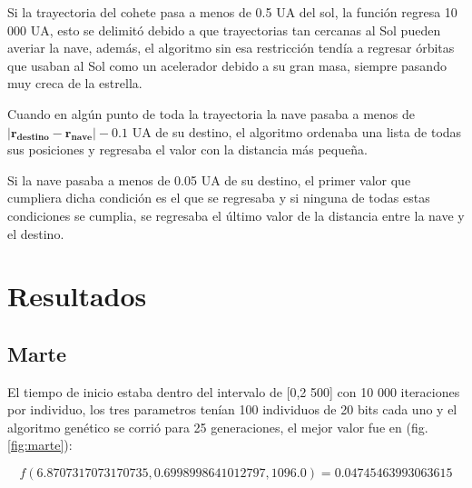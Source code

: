 \documentclass[12pt,letterpaper]{article}
\begin{document}
Si la trayectoria del cohete pasa a menos de 0.5 UA del sol, la función regresa 10 000 UA, esto se delimitó debido a que trayectorias tan cercanas al Sol pueden averiar la nave, además, el algoritmo sin esa restricción tendía a regresar órbitas que usaban al Sol como un acelerador debido a su gran masa, siempre pasando muy creca de la estrella.

Cuando en algún punto de toda la trayectoria la nave pasaba a menos de $|\mathbf{r_{destino}}-\mathbf{r_{nave}}|-0.1$ UA de su destino, el algoritmo ordenaba una lista de todas sus posiciones y regresaba el valor con la distancia más pequeña.

Si la nave pasaba a menos de 0.05 UA de su destino, el primer valor que cumpliera dicha condición es el que se regresaba y si ninguna de todas estas condiciones se cumplia, se regresaba el último valor de la distancia entre la nave y el destino.

\section*{Resultados}

\subsection*{Marte}

El tiempo de inicio estaba dentro del intervalo de [0,2 500] con 10 000 iteraciones por individuo, los tres parametros tenían 100 individuos de 20 bits cada uno y el algoritmo genético se corrió para 25 generaciones, el mejor valor fue en (fig. \ref{fig:marte}):

\[
f(6.8707317073170735, 0.6998998641012797, 1096.0) = 0.04745463993063615
\]
\end{document}

